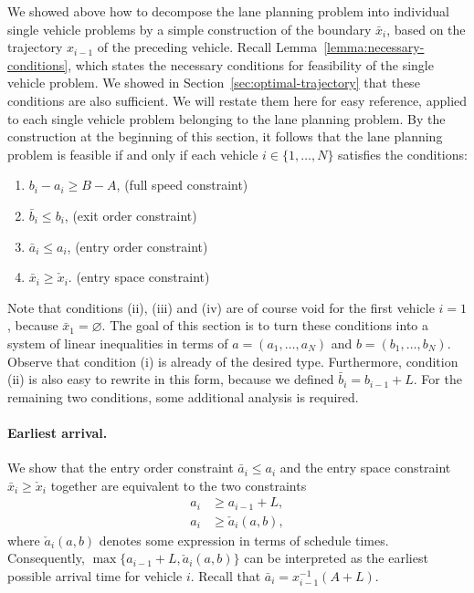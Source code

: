 \documentclass[a4paper]{article}
\theoremstyle{definition}
\theoremstyle{plain}
\begin{document}
We showed above how to decompose the lane planning problem into
individual single vehicle problems by a simple construction of the boundary
$\bar{x}_{i}$, based on the trajectory $x_{i-1}$ of the preceding vehicle.
%
Recall Lemma~\ref{lemma:necessary-conditions}, which states the necessary
conditions for feasibility of the single vehicle problem. We showed in Section~\ref{sec:optimal-trajectory}
that these conditions are also sufficient.
%
We will restate them here for easy reference, applied to each single vehicle
problem belonging to the lane planning problem. By the construction at the
beginning of this section, it follows that the lane planning problem is feasible
if and only if each vehicle $i \in \{1, \dots, N\}$ satisfies the conditions:
%
\TabPositions{3cm}
\begin{enumerate}[label=(\roman*)\quad,leftmargin=5em,midpenalty=10]
  \item $b_{i}-a_{i} \geq B-A$, \tab (full speed constraint)
  \item $\bar{b}_{i} \leq b_{i}$, \tab (exit order constraint)
  \item $\bar{a}_{i} \leq a_{i}$, \tab (entry order constraint)
  \item $\bar{x}_{i} \geq \check{x}_{i}$. \tab (entry space constraint)
\end{enumerate}
%
Note that conditions (ii), (iii) and (iv) are of course void for the first
vehicle $i=1$, because $\bar{x}_{1} = \varnothing$.
%
The goal of this section is to turn these conditions into a system of linear
inequalities in terms of $a=(a_{1}, \dots, a_{N})$ and $b=(b_{1}, \dots, b_{N})$.
Observe that condition (i) is already of the desired type. Furthermore,
condition (ii) is also easy to rewrite in this form, because we defined
$\bar{b}_{i} = b_{i-1} + L$. For the remaining two conditions, some additional
analysis is required.

\paragraph{Earliest arrival.}
We show that the entry order constraint $\bar{a}_{i} \leq a_{i}$ and the entry space constraint $\bar{x}_{i} \geq \check{x}_{i}$ together are equivalent to the two constraints
\begin{subequations}
\begin{align}
  a_{i} &\geq a_{i-1} + L , \\
  a_{i} &\geq \check{a}_{i}(a, b) ,
\end{align}
\end{subequations}
where $\check{a}_{i}(a,b)$ denotes some expression in terms of schedule times.
Consequently, $\max\{a_{i-1} + L, \check{a}_{i}(a,b)\}$ can be interpreted as
the earliest possible arrival time for vehicle $i$.
%
Recall that $\bar{a}_{i} = x^{-1}_{i-1}(A+L)$.
\end{document}
